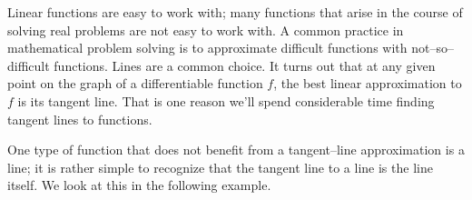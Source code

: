%
%
%

Linear functions are easy to work with; many functions that arise in the course of solving real problems are not easy to work with. A common practice in mathematical problem solving is to approximate difficult functions with not--so--difficult functions. Lines are a common choice. It turns out that at any given point on the graph of a differentiable function $f$, the best linear approximation to $f$ is its tangent line. That is one reason we'll spend considerable time finding tangent lines to functions.

One type of function that does not benefit from a tangent--line approximation is a line; it is rather simple to recognize that the tangent line to a line is the line itself. We look at this in the following example.

